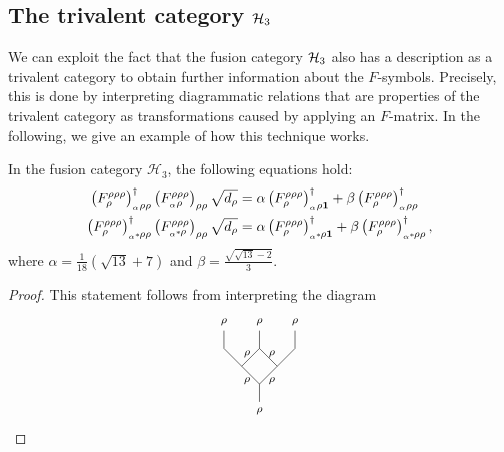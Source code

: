 {{{\subsection*{The trivalent category ${\mathcal{H}_3}$}

	We can exploit the fact that the fusion category ${\mathcal{H}_3}$ also has a description as a trivalent category to obtain further information about the $F$-symbols. Precisely, this is done by interpreting diagrammatic relations that are properties of the trivalent category as transformations caused by applying an $F$-matrix. In the following, we give an example of how this technique works.
	
	\begin{thm}
		In the fusion category $\mathcal{H}_3$, the following equations hold:
		\begin{align}
			\left(F_\rho^{\rho\rho\rho}\right)_{{}_\alpha\rho \rho}^\dagger\left(F_{{}_\alpha\rho}^{\rho\rho\rho}\right)_{\rho\rho}\sqrt{d_\rho}&=\alpha\left(F_\rho^{\rho\rho\rho}\right)^\dagger_{{}_\alpha\rho \mathbf{1}}+\beta\left(F_\rho^{\rho\rho\rho}\right)^\dagger_{{}_\alpha\rho \rho}\\
			\left(F_\rho^{\rho\rho\rho}\right)^\dagger_{{}_{\alpha^*}\!\rho \rho}\left(F_{{}_{\alpha^*}\!\rho}^{\rho\rho\rho}\right)_{\rho\rho}\sqrt{d_\rho}&=\alpha\left(F_\rho^{\rho\rho\rho}\right)^\dagger_{{}_{\alpha^*}\!\rho \mathbf{1}}+\beta\left(F_\rho^{\rho\rho\rho}\right)^\dagger_{{}_{\alpha^*}\!\rho \rho},
		\end{align}
		where $\alpha=\frac{1}{18}\left(\sqrt{13}+7\right)$ and $\beta=\frac{\sqrt{\sqrt{13}-2}}{3}$.
	\end{thm}
	\begin{proof}
		This statement follows from interpreting the diagram
			\begin{equation}
					\begin{tikzpicture}[scale=0.45,baseline={(current bounding box.center)}]
					\draw (0,0) -- (0,1);
					\draw (0,1) -- (-1,2);
					\draw (0,1) -- (1,2);
					\draw (-1,2) -- (-2,3);
					\draw (-1,2) -- (0,3);
					\draw (1,2) -- (0,3);
					\draw (-2,3) -- (-2,4);
					\draw (0,3) -- (0,4);
					\draw (1,2) -- (2,3);
					\draw (2,3) -- (2,4);
					\node (1) at (0,-0.5) {\footnotesize $\rho$};
					\node (2) at (-2,4.5) {\footnotesize $\rho$};
					\node (3) at (0,4.5) {\footnotesize $\rho$};
					\node (4) at (-0.7,1.2) {\footnotesize $\rho$};
					\node (5) at (0.7,1.2) {\footnotesize $\rho$};
					\node (6) at (-0.7,2.7) {\footnotesize $\rho$};
					\node (7) at (0.7,2.7) {\footnotesize $\rho$};
					\node (8) at (2,4.5) {\footnotesize $\rho$};

\end{tikzpicture}
\end{equation}
\end{proof}}}}
